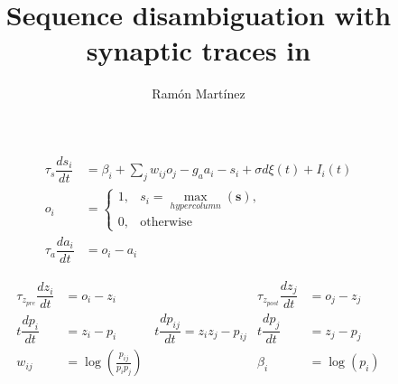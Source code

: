 \documentclass[10pt,a4paper]{article}
\author{Ram\'on Mart\'inez}
\title{Sequence disambiguation with synaptic traces in }
\begin{document}
\begin{align}
\tau_s \dfrac{ds_i}{dt} &= \beta_i + \sum_{j} w_{ij} o_j  - g_a a_i - s_i  + \sigma d\xi(t) + I_i(t) \label{eq:current} \\ o_i &=   \begin{cases}
       1,&  s_i = \underset{hypercolumn}{\max}(\mathbf{s}),\\
       0 ,& \text{otherwise}
    \end{cases} \label{eq:non-linearity} \\
\tau_a \dfrac{da_i}{dt} &= o_i - a_i \label{eq:adaptation} 
\end{align}


\begin{align}
\tau_{z_{pre}} \dfrac{dz_i}{dt} &= o_i - z_i 
& \tau_{z_{post}} \dfrac{d z_j}{dt} &= o_j - z_j \label{eq:z_traces} \\
t \dfrac{dp_i}{dt} &= z_i - p_i  
\qquad \quad t\dfrac{dp_{ij}}{dt} = z_i z_j - p_{ij}
&t\dfrac{dp_j}{dt} &= z_j - p_j    \label{eq:p_traces} \\
w_{ij} &= \log \left(\frac{p_{ij}}{p_i p_j} \right) & \beta_i &= \log(p_i) \label{eq:bcpnn} 
\end{align}



\end{document}
